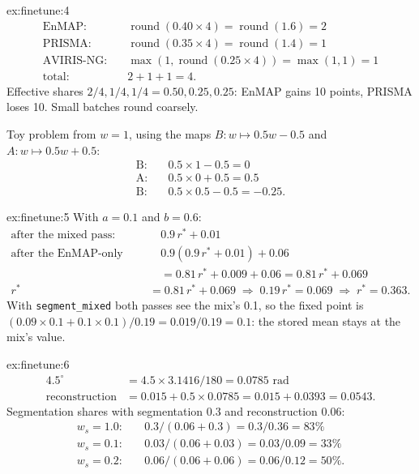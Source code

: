 \begin{solution}{ex:finetune:4}
\begin{align*}
  \text{EnMAP:}&\quad \operatorname{round}(0.40 \times 4) = \operatorname{round}(1.6) = 2\\
  \text{PRISMA:}&\quad \operatorname{round}(0.35 \times 4) = \operatorname{round}(1.4) = 1\\
  \text{AVIRIS-NG:}&\quad \max(1, \operatorname{round}(0.25 \times 4)) = \max(1, 1) = 1\\
  \text{total:}&\quad 2 + 1 + 1 = 4.
\end{align*}
Effective shares $2/4, 1/4, 1/4 = 0.50, 0.25, 0.25$: EnMAP gains 10 points, PRISMA loses 10. Small batches round coarsely.

Toy problem from $w = 1$, using the maps $B: w \mapsto 0.5w - 0.5$ and $A: w \mapsto 0.5w + 0.5$:
\begin{align*}
  \text{B:}&\quad 0.5 \times 1 - 0.5 = 0\\
  \text{A:}&\quad 0.5 \times 0 + 0.5 = 0.5\\
  \text{B:}&\quad 0.5 \times 0.5 - 0.5 = -0.25.
\end{align*}
\end{solution}

\begin{solution}{ex:finetune:5}
With $a = 0.1$ and $b = 0.6$:
\begin{align*}
  \text{after the mixed pass:}&\quad 0.9\,r^\ast + 0.01\\
  \text{after the EnMAP-only pass:}&\quad 0.9(0.9\,r^\ast + 0.01) + 0.06\\
                                   &\quad = 0.81\,r^\ast + 0.009 + 0.06 = 0.81\,r^\ast + 0.069\\
  r^\ast &= 0.81\,r^\ast + 0.069 \;\Rightarrow\; 0.19\,r^\ast = 0.069 \;\Rightarrow\; r^\ast = 0.363.
\end{align*}
With \texttt{segment\_mixed} both passes see the mix's 0.1, so the fixed point is $(0.09 \times 0.1 + 0.1 \times 0.1)/0.19 = 0.019/0.19 = 0.1$: the stored mean stays at
the mix's value.
\end{solution}

\begin{solution}{ex:finetune:6}
\begin{align*}
  4.5^\circ &= 4.5 \times 3.1416 / 180 = 0.0785 \text{ rad}\\
  \text{reconstruction} &= 0.015 + 0.5 \times 0.0785 = 0.015 + 0.0393 = 0.0543.
\end{align*}
Segmentation shares with segmentation 0.3 and reconstruction 0.06:
\begin{align*}
  w_s = 1.0:&\quad 0.3 / (0.06 + 0.3) = 0.3 / 0.36 = 83\%\\
  w_s = 0.1:&\quad 0.03 / (0.06 + 0.03) = 0.03 / 0.09 = 33\%\\
  w_s = 0.2:&\quad 0.06 / (0.06 + 0.06) = 0.06 / 0.12 = 50\%.
\end{align*}
\end{solution}
